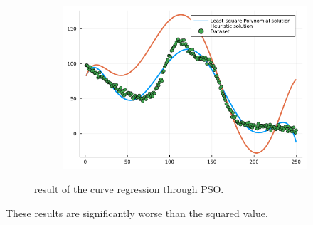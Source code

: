 \documentclass[12pt,a4paper]{article}
\begin{document}
\begin{figure}[H]\ContinuedFloat
    \centering
    \begin{subfigure}{0.6\textwidth}
        \includegraphics[width=\linewidth]{../figs/methaeuristic_regression_result3F.png}
    \end{subfigure}
    \caption{result of the curve regression through PSO.}
    \label{fig:heuristic-regression2}
\end{figure}

These results are significantly worse than the squared value.



\end{document}
